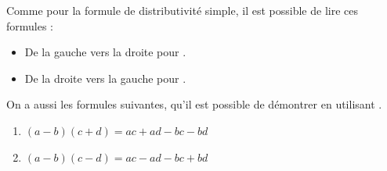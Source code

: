 \vspace{-0.4cm}\begin{Remarque}
    \bclampe Comme pour la formule de distributivité simple, il est possible de lire ces formules :
    \begin{itemize}
        \item De la gauche vers la droite pour .
        \item De la droite vers la gauche pour .
    \end{itemize}
    On a aussi les formules suivantes, qu'il est possible de démontrer en utilisant .
    \vspace{-0.65cm}
    \begin{multicols}{2}
        \begin{enumerate}
            \item $(a-b)(c+d)=ac+ad-bc-bd$
            \item $(a-b)(c-d)=ac-ad-bc+bd$
        \end{enumerate}
    \end{multicols}
\end{Remarque}
\def\points{8}
\def\rdifficulty{3}

